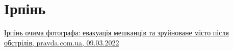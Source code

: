  
 
 
 
 
\section{Ірпінь}

\hyperlink{09_03_2022.stz.news.ua.pravda.1.irpen}{%
Ірпінь очима фотографа: евакуація мешканців та зруйноване місто після обстрілів, %
pravda.com.ua, 09.03.2022%
}
